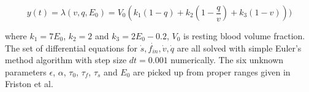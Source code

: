 \begin{equation}
y(t)= \lambda (v,q,E_0) = V_0 (k_1(1-q) + k_2(1- \frac{q}{v}) + k_3(1-v)))
\end{equation} 

where $k_1 = 7E_0$, $k_2 = 2$  and $k_3 = 2E_0 - 0.2$, $V_0$ is resting blood volume fraction. The set of differential equations for ${\dot{s}, \dot{f_{in}}, \dot{v}, \dot{q}}$ are all solved with simple Euler's method algorithm with step size $dt=0.001$ numerically. The six unknown parameters $\epsilon$, $\alpha$, $\tau_0$, $\tau_f$, $\tau_s$ and $E_0$ are picked up from proper ranges given in Friston et al. 





 
